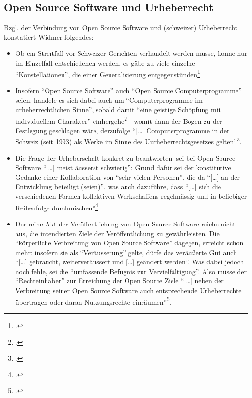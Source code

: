 \documentclass[DIV=calc,BCOR=5mm,11pt,headings=small,oneside,abstract=true, toc=bib]{scrartcl}
\begin{document}
\subsection{Open Source Software und Urheberrecht}

Bzgl. der Verbindung von Open Source Software und (schweizer) Urheberrecht
konstatiert Widmer folgendes:
\begin{itemize}
  \item Ob ein Streitfall vor Schweizer Gerichten verhandelt werden müsse, könne
  nur im Einzelfall entschiedenen werden, es gäbe zu viele einzelne
  \enquote{Konstellationen}, die einer Generalisierung
  entgegenstünden\footcite[vgl.][53]{Widmer2003a}
  \item Insofern \enquote{Open Source Software} auch \enquote{Open
  Source Computerprogramme} seien, handele es sich dabei auch um
  \enquote{Computerprogramme im urheberrechtlichen Sinne}, sobald damit
  \enquote{eine geistige Schöpfung mit individuellem Charakter}
  einhergehe\footcite[vgl.][70]{Widmer2003a} - womit dann der Bogen zu der
  Festlegung geschlagen wäre, derzufolge \enquote{[\ldots]
  Computerprogramme in der Schweiz (seit 1993) als Werke im Sinne des
  Uurheberrechtsgesetzes gelten}\footcite[vgl.][2]{Widmer2003a}.
  \item Die Frage der Urheberschaft konkret zu beantworten, sei bei Open Source
  Software \enquote{[\ldots] meist äusserst schwierig}: Grund dafür sei der
  konstitutive Gedanke einer Kollaboration von \enquote{sehr vielen
  Personen}, die da \enquote{[\ldots] an der Entwicklung beteiligt
  (seien)}, was auch dazuführe, dass \enquote{[\ldots] sich die
  verschiedenen Formen kollektiven Werkschaffens regelmässig und in
  beliebiger Reihenfolge durchmischen}\footcite[vgl.][86]{Widmer2003a}
  \item Der reine Akt der Veröffentlichung von Open Source Software reiche nicht
  aus, die intendierten Ziele der Veröffentlichung zu gewährleisten. Die
  \enquote{kör\-per\-liche Verbreitung von Open Source Software} dagegen,
  erreicht schon mehr: insofern sie als \enquote{Veräusserung} gelte, dürfe
  das veräußerte Gut auch \enquote{[\ldots] gebraucht, weiterveräussert und
  [\ldots] geändert werden}. Was dabei jedoch noch fehle, sei die
  \enquote{umfassende Befugnis zur Vervielfältigung}. Also müsse der
  \enquote{Rechteinhaber} zur Erreichung der Open Source Ziele
  \enquote{[\ldots] neben der Verbreitung seiner Open Source Software auch
  entsprechende Urheberrechte übertragen oder daran Nutzungsrechte
  einräumen}\footcite[vgl.][98]{Widmer2003a}.

\end{itemize}
\end{document}
